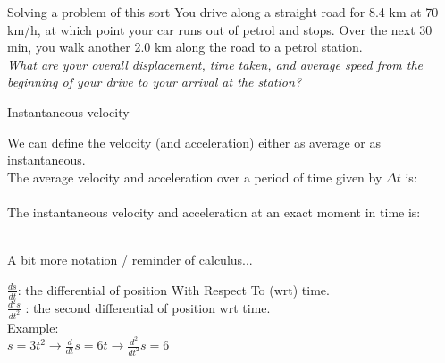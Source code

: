 %   
\begin{frame}{Solving a problem of this sort}
\small
You drive along a straight road for 8.4 km at 70 km/h, at which point your car runs out of petrol and stops. Over the next 30 min, you walk another 2.0 km along the road to a petrol station.\\[1ex]
\textit{What are your overall displacement, time taken, and average speed from the beginning of your drive to your arrival at the station?}\\[1ex]

\vspace{5cm}
\end{frame}

 
\begin{frame}{Instantaneous velocity}

We can define the velocity (and acceleration) either as average or as instantaneous.\\[2ex]

The average velocity and acceleration over a period of time given by $\Delta t$ is: \\[2ex]
 \\[2ex]

The instantaneous velocity and acceleration  at an exact moment in time is: \\[2ex]
 \\[1ex]
\end{frame}



%  
\begin{frame}{A bit more notation / reminder of calculus...}

$\frac{d s }{d t} $: the differential of position With Respect To (wrt) time.\\[1ex]
$\frac{d^2 s }{d t^2} $ : the second differential of position wrt time.\\[6ex]

Example: \\[1ex]

$s = 3t^2 \rightarrow \frac{d }{d t} s = 6t \rightarrow \frac{d^2 }{d t^2} s = 6$\\[1ex]


\end{frame}

